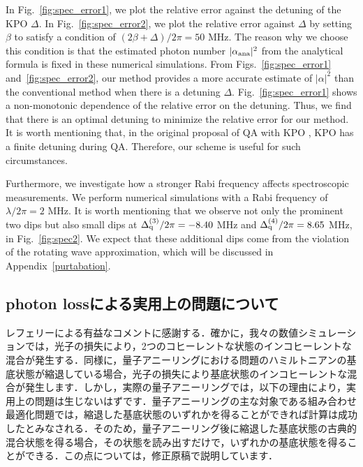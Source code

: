 In Fig.~\ref{fig:spec_error1}, we plot the relative error against the detuning of the KPO $\Delta$.
In Fig.~\ref{fig:spec_error2}, we plot the relative error against 
$\Delta$ by setting $\beta$ to satisfy a condition of $(2\beta + \Delta)/2\pi = 50$ MHz.
The reason why we choose this condition is that the estimated photon number $|\alpha_{\rm{ana}}|^2$ from the analytical formula is fixed in these numerical simulations.
From Figs.~\ref{fig:spec_error1} and~\ref{fig:spec_error2}, our method provides a more accurate estimate of $|\alpha|^2$ than the conventional method when there is a detuning $\Delta$. 
Fig.~\ref{fig:spec_error1} shows a non-monotonic dependence of the relative error on the detuning. Thus, we find that there is an optimal detuning to minimize the relative error
for our method.
It is worth mentioning that, in the original proposal of QA with KPO \cite{goto2016bifurcation}, KPO has a finite detuning during QA. Therefore, our scheme is useful for such circumstances.


Furthermore, we investigate how a stronger Rabi frequency affects spectroscopic measurements.
We perform numerical simulations with a Rabi frequency
of
$\lambda /2\pi = 2$ MHz.
It is worth mentioning that
we observe not only the prominent two dips but also small dips
at $\Delta _{\rm{q}}^{(3)}/2\pi=-8.40$ MHz and $\Delta _{\rm{q}}^{(4)}/2\pi=8.65$ MHz, in Fig.~\ref{fig:spec2}.
We expect that these additional dips come from the violation of the rotating wave approximation, which  will be discussed in Appendix~\ref{purtabation}.

\subsection{photon lossによる実用上の問題について}
レフェリーによる有益なコメントに感謝する．確かに，我々の数値シミュレーションでは，光子の損失により，2つのコヒーレントな状態のインコヒーレントな混合が発生する．同様に，量子アニーリングにおける問題のハミルトニアンの基底状態が縮退している場合，光子の損失により基底状態のインコヒーレントな混合が発生します．しかし，実際の量子アニーリングでは，以下の理由により，実用上の問題は生じないはずです．量子アニーリングの主な対象である組み合わせ最適化問題では，縮退した基底状態のいずれかを得ることができれば計算は成功したとみなされる．そのため，量子アニーリング後に縮退した基底状態の古典的混合状態を得る場合，その状態を読み出すだけで，いずれかの基底状態を得ることができる．この点については，修正原稿で説明しています．

